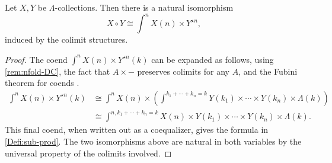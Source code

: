 \begin{lem}\label{lem:star-of-circle}
  Let $X, Y$ be $\Lambda$-collections. Then there is a natural isomorphism
  \[
  X \circ Y \cong  \int^{n} X(n) \times Y^{\star n},
  \]
  induced by the colimit structures.
\end{lem}
\begin{proof}
The coend $\int^{n} X(n) \times Y^{\star n}(k)$ can be expanded as follows, using \cref{rem:nfold-DC}, the fact that $A \times -$ preserves colimits for any $A$, and the Fubini theorem for coends \cite[Theorem 1.3.1]{loregian}.
\begin{align*}
\int^{n} X(n) \times Y^{\star n}(k) & \cong \int^{n} X(n) \times \left( \int^{k_{1}+ \cdots + k_{n}=k } Y(k_{1}) \times \cdots \times Y(k_{n}) \times \Lambda(k) \right) \\
& \cong \int^{n, k_{1}+ \cdots + k_{n}=k} X(n) \times Y(k_{1}) \times \cdots \times Y(k_{n}) \times \Lambda(k).
\end{align*}
This final coend, when written out as a coequalizer, gives the formula in \cref{Defi:sub-prod}.
The two isomorphisms above are natural in both variables by the universal property of the colimits involved.
\end{proof}

